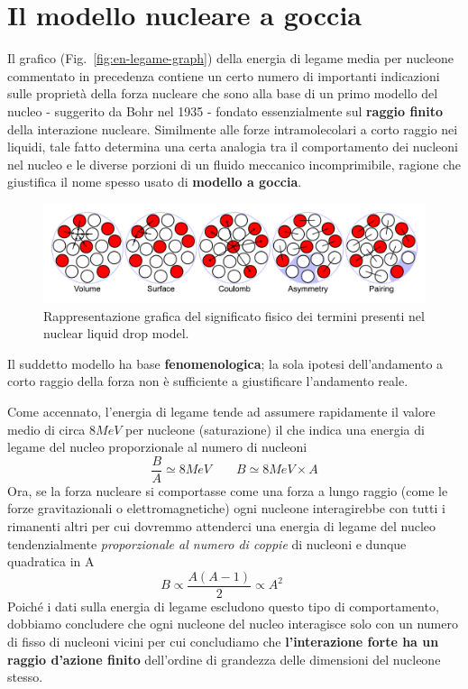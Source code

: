 \section{Il modello nucleare a goccia}\label{sec:il-modello-nucleare-a-goccia}
Il grafico (Fig.~\ref{fig:en-legame-graph}) della energia di legame media per nucleone commentato in precedenza
contiene un certo numero di importanti indicazioni
sulle proprietà della forza nucleare che sono alla base di un primo
modello del nucleo - suggerito da Bohr nel 1935 - fondato essenzialmente
sul \textbf{raggio finito} della interazione nucleare.
Similmente alle forze intramolecolari a corto raggio nei liquidi,
tale fatto determina una certa analogia tra il comportamento dei nucleoni
nel nucleo e le diverse porzioni di un fluido meccanico incomprimibile, ragione che
giustifica il nome spesso usato di \textbf{modello a goccia}.
\begin{figure}
	\centering
	\includegraphics{figs/liquid-drop-model}
	\caption{Rappresentazione grafica del significato fisico dei termini presenti nel nuclear liquid drop model.}
	\label{fig:liquid-drop-model}
\end{figure}

Il suddetto modello ha base \textbf{fenomenologica}; la sola ipotesi
dell'andamento a corto raggio della forza non è sufficiente a
giustificare l'andamento reale.

Come accennato, l'energia di legame tende ad assumere rapidamente il
valore medio di circa \(8MeV\) per nucleone (saturazione) il che indica
una energia di legame del nucleo proporzionale al numero di nucleoni
\begin{equation}
	\frac{B}{A} \simeq 8 MeV \qquad B \simeq 8 MeV \times A
    \label{eq:saturation-binding-energy-per-nucleon}
\end{equation}
Ora, se la forza nucleare si comportasse come una forza a lungo
raggio (come le forze gravitazionali o elettromagnetiche) ogni nucleone
interagirebbe con tutti i rimanenti altri per cui dovremmo attenderci
una energia di legame del nucleo tendenzialmente \emph{proporzionale al numero
di coppie} di nucleoni e dunque quadratica in A
\[
	B \propto \frac{A(A-1)}{2} \propto A^{2} \qquad
\]
Poiché i dati sulla energia di legame escludono questo tipo di
comportamento, dobbiamo concludere che ogni nucleone del nucleo
interagisce solo con un numero di fisso di nucleoni vicini per cui
concludiamo che \textbf{l'interazione forte ha un raggio d'azione finito}
dell'ordine di grandezza delle dimensioni del nucleone stesso.

